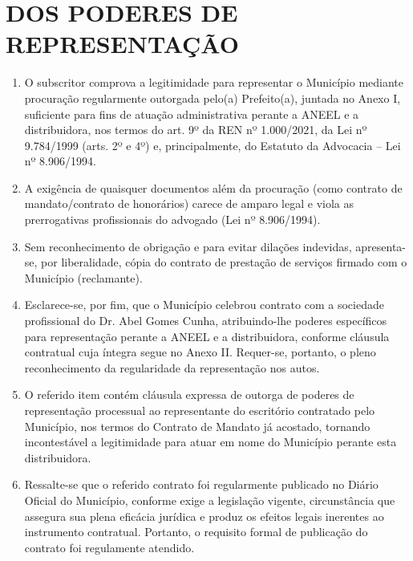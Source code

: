 \section{DOS PODERES DE REPRESENTAÇÃO}

\begin{enumerate}
\item O subscritor comprova a legitimidade para representar o Município mediante procuração regularmente outorgada pelo(a) Prefeito(a), juntada no Anexo I, suficiente para fins de atuação administrativa perante a ANEEL e a distribuidora, nos termos do art. 9º da REN nº 1.000/2021, da Lei nº 9.784/1999 (arts. 2º e 4º) e, principalmente, do Estatuto da Advocacia – Lei nº 8.906/1994.
\item A exigência de quaisquer documentos além da procuração (como contrato de mandato/contrato de honorários) carece de amparo legal e viola as prerrogativas profissionais do advogado (Lei nº 8.906/1994). 
\item Sem reconhecimento de obrigação e para evitar dilações indevidas, apresenta-se, por liberalidade, cópia do contrato de prestação de serviços firmado com o Município (reclamante).
\item Esclarece-se, por fim, que o Município celebrou contrato com a sociedade profissional do Dr. Abel Gomes Cunha, atribuindo-lhe poderes específicos para representação perante a ANEEL e a distribuidora, conforme cláusula contratual cuja íntegra segue no Anexo II. Requer-se, portanto, o pleno reconhecimento da regularidade da representação nos autos.

\Citacao{\clausula{}}

\item O referido item contém cláusula expressa de outorga de poderes de representação processual ao representante do escritório contratado pelo Município, nos termos do Contrato de Mandato já acostado, tornando incontestável a legitimidade para atuar em nome do Município perante esta distribuidora.
\item Ressalte-se que o referido contrato foi regularmente publicado no Diário Oficial do Município, conforme exige a legislação vigente, circunstância que assegura sua plena eficácia jurídica e produz os efeitos legais inerentes ao instrumento contratual. Portanto, o requisito formal de publicação do contrato foi regulamente atendido. 
\end{enumerate}
